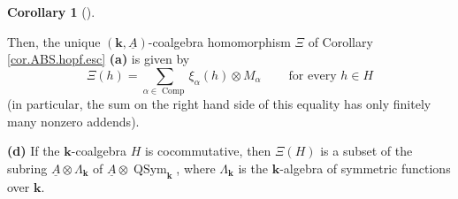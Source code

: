 \documentclass[numbers=enddot,12pt,final,onecolumn,notitlepage,abstracton]{scrartcl}%
\theoremstyle{definition}
\newtheorem{coro}[theo]{Corollary}
\newenvironment{corollary}[1][]
{\begin{coro}[#1]\begin{leftbar}}
{\end{leftbar}\end{coro}}
\let\sumnonlimits\sum
\renewcommand{\sum}{\sumnonlimits\limits}
\begin{document}
\begin{corollary}
Then, the unique $\left(  \mathbf{k},\underline{A}\right)  $-coalgebra
homomorphism $\Xi$ of Corollary \ref{cor.ABS.hopf.esc} \textbf{(a)} is given
by
\[
\Xi\left(  h\right)  =\sum_{\alpha\in\operatorname*{Comp}}\xi_{\alpha}\left(
h\right)  \otimes M_{\alpha}\ \ \ \ \ \ \ \ \ \ \text{for every }h\in H
\]
(in particular, the sum on the right hand side of this equality has only
finitely many nonzero addends).

\textbf{(d)} If the $\mathbf{k}$-coalgebra $H$ is cocommutative, then
$\Xi\left(  H\right)  $ is a subset of the subring $\underline{A}%
\otimes\Lambda_{\mathbf{k}}$ of $\underline{A}\otimes\operatorname*{QSym}%
\nolimits_{\mathbf{k}}$, where $\Lambda_{\mathbf{k}}$ is the $\mathbf{k}%
$-algebra of symmetric functions over $\mathbf{k}$.
\end{corollary}
\end{document}
